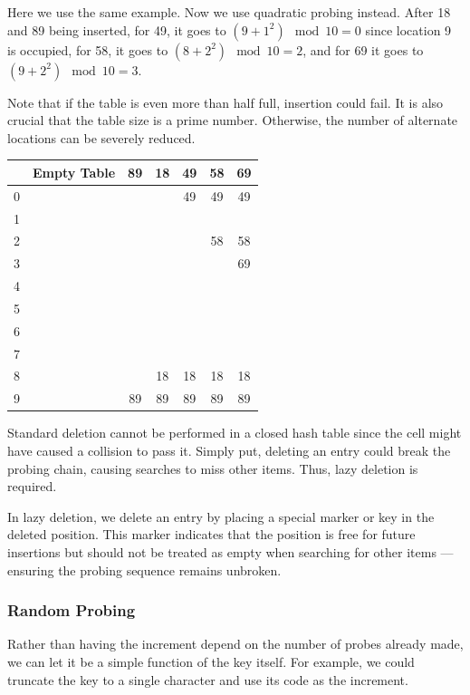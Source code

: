\begin{minipage}{0.5\textwidth}
Here we use the same example. Now we use quadratic probing instead. After 18 and 89 being inserted, for 49, it goes to \((9 + 1^2) \mod 10 = 0\) since location 9 is occupied, for 58, it goes to \((8 + 2^2) \mod 10 = 2\), and for 69 it goes to \((9 + 2^2) \mod 10 = 3\). 

Note that if the table is even more than half full, insertion could fail. It is also crucial that the table size is a prime number. Otherwise, the number of alternate locations can be severely reduced.
\end{minipage}
\begin{minipage}{0.5\textwidth}
\begin{table}[H]
  \centering
  \begin{tabular}{c|c|c|c|c|c|c}
      \toprule
        & Empty Table & 89 & 18 & 49 & 58 & 69  \\
    \midrule
      0 &  &  &  & 49 & 49 & 49  \\
      1 &  &  &  &  &  &   \\
      2 &  &  &  &  & 58 & 58  \\
      3 &  &  &  &  &  & 69  \\
      4 &  &  &  &  &  &   \\
      5 &  &  &  &  &  &   \\
      6 &  &  &  &  &  &   \\
      7 &  &  &  &  &  &   \\
      8 &  &  & 18 & 18 & 18 & 18  \\
      9 &  & 89 & 89 & 89 & 89 & 89  \\
      \bottomrule
  \end{tabular}
\end{table}
\end{minipage}

Standard deletion cannot be performed in a closed hash table since the cell might have caused a collision to pass it. Simply put, deleting an entry could break the probing chain, causing searches to miss other items. Thus, lazy deletion is required.

In lazy deletion, we delete an entry by placing a special marker or key in the deleted position. This marker indicates that the position is free for future insertions but should not be treated as empty when searching for other items — ensuring the probing sequence remains unbroken.

\subsubsection{Random Probing}
Rather than having the increment depend on the number of probes already made, we can let it be a simple function of the key itself. For example, we could truncate the key to a single character and use its code as the increment.

